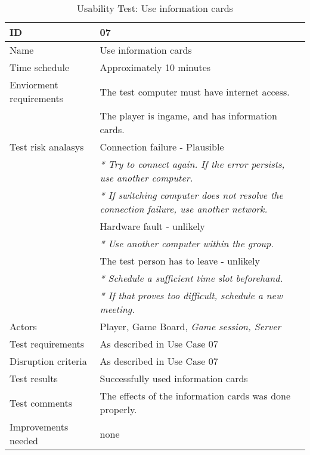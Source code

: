 {\footnotesize
\begin{table}[H]
\begin{tabular}{| p{5cm} | p{10cm} |}\hline
	\textbf{ID}	& \textbf{07} \\ \hline
	Name		& Use information cards\\ \hline
	Time schedule	& Approximately 10 minutes\\ \hline
	Enviorment requirements 
		& The test computer must have internet access. \\ 
		& The player is ingame, and has information cards.\\ \hline
	Test risk analasys 
		& Connection failure - Plausible \\
		& \emph{* Try to connect again. If the error persists, use another computer.} \\
		& \emph{* If switching computer does not resolve the connection failure, use another network.}\\
		& Hardware fault - unlikely \\
		& \emph{* Use another computer within the group.} \\
		& The test person has to leave - unlikely \\
		& \emph{* Schedule a sufficient time slot beforehand.} \\
		& \emph{* If that proves too difficult, schedule a new meeting.}\\ \hline
	Actors	& Player, Game Board, \emph{Game session, Server}\\ \hline
	Test requirements & As described in Use Case 07 \\ \hline
	Disruption criteria & As described in Use Case 07  \\ \hline
	Test results & Successfully used information cards \\ \hline
	Test comments & The effects of the information cards was done properly. \\ \hline
	Improvements needed & none \\ \hline
\end{tabular}


\caption{Usability Test: Use information cards}
\label{fig:usability_test_7}
\end{table}}


